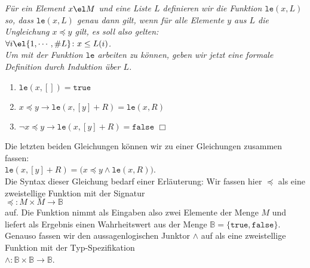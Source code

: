 \begin{Definition}[$\mathtt{le}(x,L)$]
{\em
  F\"ur ein Element $x\el M$ und eine Liste $L$ definieren wir die Funktion
  $\mathtt{le}(x, L)$ so, dass $\mathtt{le}(x, L)$ genau dann gilt, wenn f\"ur  alle
  Elemente $y$ aus $L$ die Ungleichung $x \preceq y$ gilt, es soll also gelten: \\[0.1cm]
  \hspace*{1.3cm} $\forall i \el \{ 1, \cdots, \#L \} \colon x \leq L(i)$. \\[0.1cm]
  Um mit der Funktion $\mathtt{le}$ arbeiten zu k\"onnen, geben wir jetzt eine 
  formale Definition durch Induktion \"uber $L$.
  \begin{enumerate}
  \item $\mathtt{le}(x, []) = \mathtt{true}$
  \item $x \preceq y \rightarrow \mathtt{le}(x, [y] + R) = \mathtt{le}(x, R)$
  \item $\neg x \preceq y \rightarrow \mathtt{le}(x, [y] + R) = \mathtt{false}$
        \hspace*{\fill} $\Box$
  \end{enumerate}
}
\end{Definition}
Die letzten beiden Gleichungen k\"onnen wir zu einer Gleichungen zusammen fassen: \\[0.1cm]
\hspace*{1.3cm} 
$\mathtt{le}(x, [y] + R) = \bigl(x \preceq y \wedge \mathtt{le}(x, R)\bigr)$. 
\\[0.1cm]
Die Syntax dieser Gleichung bedarf einer Erl\"auterung: Wir fassen hier $\preceq$ als eine
zweistellige Funktion mit der Signatur \\[0.1cm]
\hspace*{1.3cm} $\preceq: M \times M \rightarrow \mathbb{B}$ \\[0.1cm]
auf.  Die Funktion nimmt als Eingaben also zwei Elemente der Menge $M$ 
und liefert als Ergebnis einen Wahrheitswert aus der Menge 
$\mathbb{B} = \{ \mathtt{true}, \mathtt{false} \}$.  Genauso fassen wir den aussagenlogischen Junktor
$\wedge$ auf als eine zweistellige Funktion mit der Typ-Spezifikation \\[0.1cm]
\hspace*{1.3cm} $\wedge : \mathbb{B} \times \mathbb{B} \rightarrow \mathbb{B}$. 

